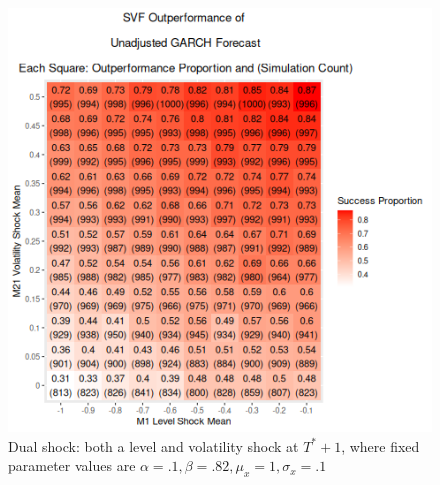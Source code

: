 \documentclass[11pt]{article}
\theoremstyle{definition}
\begin{document}
\begin{figure}[h]
  \begin{center}
    \includegraphics[scale=.5]{simulation_plots/dual_level_vol_shock_FriFeb0911:03:49PM2024.png}
    \caption{Dual shock: both a level and volatility shock at $T^{*}+1$, where fixed parameter values are $\alpha = .1, \beta = .82, \mu_{x} = 1, \sigma_{x} = .1$}
    \label{fig:dual_shock_strong_beta}
    \end{center}
  \end{figure}
\end{document}
